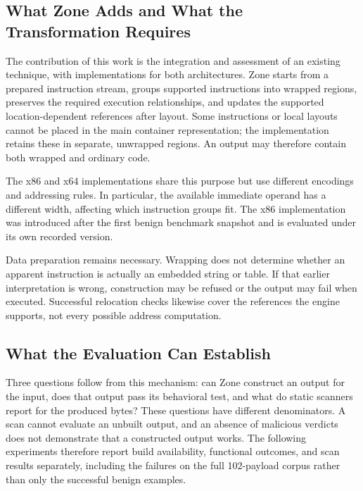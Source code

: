 \subsection{What Zone Adds and What the Transformation Requires}
The contribution of this work is the integration and assessment of an
existing technique, with implementations for both architectures. Zone
starts from a prepared instruction stream, groups supported instructions
into wrapped regions, preserves the required execution relationships, and
updates the supported location-dependent references after layout. Some
instructions or local layouts cannot be placed in the main container
representation; the implementation retains these in separate, unwrapped
regions. An output may therefore contain both wrapped and ordinary code.

The x86 and x64 implementations share this purpose but use different
encodings and addressing rules. In particular, the available immediate
operand has a different width, affecting which instruction groups fit.
The x86 implementation was introduced after the first benign benchmark
snapshot and is evaluated under its own recorded version.

Data preparation remains necessary. Wrapping does not determine whether
an apparent instruction is actually an embedded string or table. If that
earlier interpretation is wrong, construction may be refused or the output
may fail when executed. Successful relocation checks likewise cover the
references the engine supports, not every possible address computation.

\subsection{What the Evaluation Can Establish}
Three questions follow from this mechanism: can Zone construct an output
for the input, does that output pass its behavioral test, and what do static
scanners report for the produced bytes? These questions have different
denominators. A scan cannot evaluate an unbuilt output, and an absence of
malicious verdicts does not demonstrate that a constructed output works.
The following experiments therefore report build availability, functional
outcomes, and scan results separately, including the failures on the full
102-payload corpus rather than only the successful benign examples.
